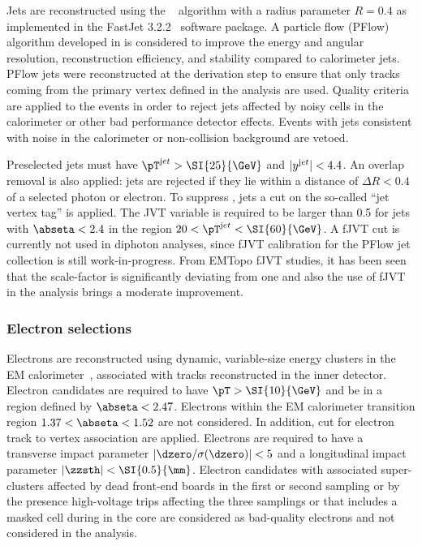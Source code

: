 Jets are reconstructed using the  \antikt~\cite{Cacciari:2008gp}
algorithm with a radius parameter $R=0.4$ as implemented in the {\textsc FastJet} 3.2.2~\cite{Fastjet,Cacciari:2005hq} software package. A particle flow (PFlow) algorithm developed in  is considered to improve the energy and angular resolution, reconstruction efficiency, and \pileup stability compared to calorimeter jets. PFlow jets were reconstructed at the derivation step to ensure that only tracks coming from the primary vertex defined in the analysis are used. Quality criteria are applied to the events in order to reject jets affected by noisy cells in the calorimeter or other bad performance detector effects. Events with jets consistent with noise in the calorimeter or non-collision background are vetoed.

Preselected jets must have $\pT^{\textrm jet} > \SI{25}{\GeV}$ and $|y^{\textrm jet} |<4.4$. An overlap removal is also applied: jets are rejected if they lie within a distance
of $\Delta R < 0.4$ of a selected photon or electron. To suppress \pileup, jets a cut on the so-called ``jet vertex tag'' is applied. The JVT variable is required
to be larger than 0.5 for jets with $\abseta< 2.4$ in the region $20<\pT^{\textrm jet}<\SI{60}{\GeV}$. A fJVT cut is currently not used in diphoton analyses, since fJVT calibration for the
PFlow jet collection is still work-in-progress. From EMTopo fJVT studies, it has been seen that the scale-factor is significantly deviating from one and also the use of fJVT in the analysis brings a moderate improvement.



\subsubsection{Electron selections}
Electrons are reconstructed using dynamic, variable-size energy clusters in the EM calorimeter~\cite{ATL-PHYS-PUB-2017-022}, associated with tracks reconstructed in the inner detector. Electron candidates are required to have $\pT>\SI{10}{\GeV}$  and be in a region defined by $\abseta<2.47$. Electrons within the EM calorimeter transition region $1.37<\abseta<1.52$ are not considered. In addition, cut for electron track to vertex association are applied. Electrons are required to have a transverse impact parameter $\left|\dzero/\sigma(\dzero)\right|<5$ and a longitudinal impact parameter $\left|\zzsth\right|<\SI{0.5}{\mm}$. Electron candidates with associated super-clusters affected by dead front-end boards in the first or second sampling or by the presence high-voltage trips affecting the three samplings or that includes a masked cell during in the core are considered as bad-quality electrons and not considered in the analysis.

